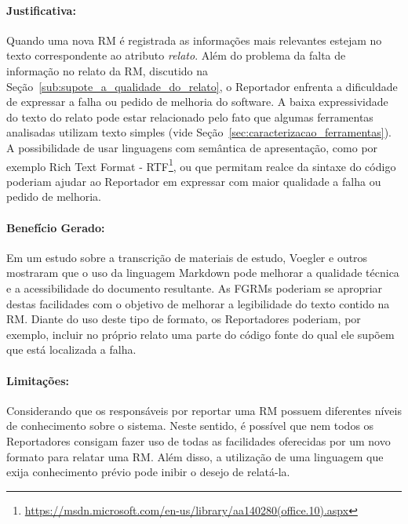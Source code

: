 \paragraph{Justificativa:}
\label{par:justificativa_s06}

Quando uma nova RM é registrada as informações mais relevantes estejam no texto
correspondente ao atributo \textit{relato}. Além do problema da falta de
informação no relato da RM, discutido na
Seção~\ref{sub:supote_a_qualidade_do_relato}, o Reportador enfrenta a
dificuldade de expressar a falha ou pedido de melhoria do software. A baixa
expressividade do texto do relato pode estar relacionado pelo fato que algumas
ferramentas analisadas utilizam texto simples (vide
Seção~\ref{sec:caracterizacao_ferramentas}). A possibilidade de usar linguagens
com semântica de apresentação, como por exemplo Rich Text Format \@-\@
RTF\footnote{\url{https://msdn.microsoft.com/en-us/library/aa140280(office.10).aspx}},
ou que permitam realce da sintaxe do código poderiam ajudar ao Reportador em
expressar com maior qualidade a falha ou pedido de melhoria.

\paragraph{Benefício Gerado:}
\label{par:papéis_afetados_s06}

Em um estudo sobre a transcrição de materiais de estudo, Voegler e
outros~\cite{voegler2014markdown} mostraram que o uso da linguagem Markdown pode
melhorar a qualidade técnica e a acessibilidade do documento resultante. As
FGRMs poderiam se apropriar destas facilidades com o objetivo de melhorar a
legibilidade do texto contido na RM\@. Diante do uso deste tipo de formato, os
Reportadores poderiam, por exemplo, incluir no próprio relato uma parte do
código fonte do qual ele supõem que está localizada a falha.

\paragraph{Limitações:}
\label{par:limitacoes_s06}

Considerando que os responsáveis por reportar uma RM possuem diferentes níveis
de conhecimento sobre o sistema. Neste sentido, é possível que nem todos os
Reportadores consigam fazer uso de todas as facilidades oferecidas por um novo
formato para relatar uma RM\@. Além disso, a utilização de uma linguagem que
exija conhecimento prévio pode inibir o desejo de relatá-la.

